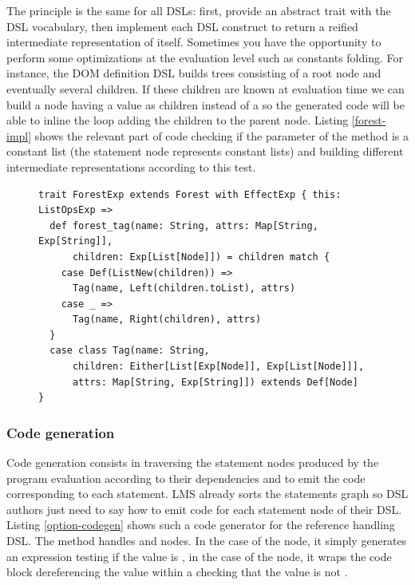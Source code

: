 \documentclass[american,english,runningheads]{llncs}
\begin{document}
The principle is the same for all DSLs: first, provide an abstract trait with the DSL vocabulary, then implement each
DSL construct to return a reified intermediate representation of itself. Sometimes you have the opportunity
to perform some optimizations at the evaluation level such as constants folding. For instance, the DOM definition DSL
builds trees consisting of a root node and eventually several children. If these children are known at evaluation
time we can build a node having a  value as children instead of a  so the
generated code will be able to inline the loop adding the children to the parent node. Listing \ref{forest-impl}
shows the relevant part of code checking if the  parameter of the  method is a
constant list (the  statement node represents constant lists) and building different intermediate
representations according to this test.

\begin{figure}
\begin{lstlisting}[caption=Optimized intermediate representation for the DOM definition DSL,label=forest-impl]
trait ForestExp extends Forest with EffectExp { this: ListOpsExp =>
  def forest_tag(name: String, attrs: Map[String, Exp[String]],
      children: Exp[List[Node]]) = children match {
    case Def(ListNew(children)) =>
      Tag(name, Left(children.toList), attrs)
    case _ =>
      Tag(name, Right(children), attrs)
  }
  case class Tag(name: String,
      children: Either[List[Exp[Node]], Exp[List[Node]]],
      attrs: Map[String, Exp[String]]) extends Def[Node]
}
\end{lstlisting}
\end{figure}

\subsubsection{Code generation}

Code generation consists in traversing the statement nodes produced by the program evaluation according to their
dependencies and to emit the code corresponding to each statement. LMS already sorts the statements graph so DSL
authors just need to say how to emit code for each statement node of their DSL. Listing \ref{option-codegen} shows
such a code generator for the  reference handling DSL. The  method handles
 and  nodes. In the case of the  node, it simply
generates an expression testing if the value is , in the case of the  node, it wraps
the code block dereferencing the value within a  checking that the value is not .
\end{document}
